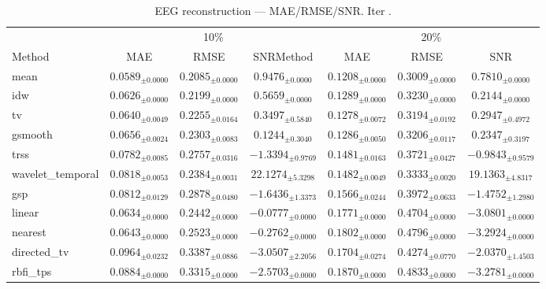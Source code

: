 ﻿%
\begin{table}[ht]
\centering
\caption[EEG reconstruction - Iteration it37]{EEG reconstruction — MAE/RMSE/SNR. Iter .}
\label{tab:main_it37_3syn_alpha_low_missing}
\small
\begin{tabular}{lcccccc}
\toprule
\multicolumn{1}{c}{} & \multicolumn{3}{c}{10\%} & \multicolumn{3}{c}{20\%} \\
\cmidrule(lr){2-4} \cmidrule(lr){5-7}
Method & MAE & RMSE & SNRMethod & MAE & RMSE & SNR \\
\midrule
mean & $0.0589_{\pm 0.0000}$ & $0.2085_{\pm 0.0000}$ & $0.9476_{\pm 0.0000}$ & $0.1208_{\pm 0.0000}$ & $0.3009_{\pm 0.0000}$ & $0.7810_{\pm 0.0000}$ \\
idw & $0.0626_{\pm 0.0000}$ & $0.2199_{\pm 0.0000}$ & $0.5659_{\pm 0.0000}$ & $0.1289_{\pm 0.0000}$ & $0.3230_{\pm 0.0000}$ & $0.2144_{\pm 0.0000}$ \\
tv & $0.0640_{\pm 0.0049}$ & $0.2255_{\pm 0.0164}$ & $0.3497_{\pm 0.5840}$ & $0.1278_{\pm 0.0072}$ & $0.3194_{\pm 0.0192}$ & $0.2947_{\pm 0.4972}$ \\
gsmooth & $0.0656_{\pm 0.0024}$ & $0.2303_{\pm 0.0083}$ & $0.1244_{\pm 0.3040}$ & $0.1286_{\pm 0.0050}$ & $0.3206_{\pm 0.0117}$ & $0.2347_{\pm 0.3197}$ \\
trss & $0.0782_{\pm 0.0085}$ & $0.2757_{\pm 0.0316}$ & $-1.3394_{\pm 0.9769}$ & $0.1481_{\pm 0.0163}$ & $0.3721_{\pm 0.0427}$ & $-0.9843_{\pm 0.9579}$ \\
wavelet\_temporal & $0.0818_{\pm 0.0053}$ & $0.2384_{\pm 0.0031}$ & $22.1274_{\pm 5.3298}$ & $0.1482_{\pm 0.0049}$ & $0.3333_{\pm 0.0020}$ & $19.1363_{\pm 4.8317}$ \\
gsp & $0.0812_{\pm 0.0129}$ & $0.2878_{\pm 0.0480}$ & $-1.6436_{\pm 1.3373}$ & $0.1566_{\pm 0.0244}$ & $0.3972_{\pm 0.0633}$ & $-1.4752_{\pm 1.2980}$ \\
linear & $0.0634_{\pm 0.0000}$ & $0.2442_{\pm 0.0000}$ & $-0.0777_{\pm 0.0000}$ & $0.1771_{\pm 0.0000}$ & $0.4704_{\pm 0.0000}$ & $-3.0801_{\pm 0.0000}$ \\
nearest & $0.0643_{\pm 0.0000}$ & $0.2523_{\pm 0.0000}$ & $-0.2762_{\pm 0.0000}$ & $0.1802_{\pm 0.0000}$ & $0.4796_{\pm 0.0000}$ & $-3.2924_{\pm 0.0000}$ \\
directed\_tv & $0.0964_{\pm 0.0232}$ & $0.3387_{\pm 0.0886}$ & $-3.0507_{\pm 2.2056}$ & $0.1704_{\pm 0.0274}$ & $0.4274_{\pm 0.0770}$ & $-2.0370_{\pm 1.4503}$ \\
rbfi\_tps & $0.0884_{\pm 0.0000}$ & $0.3315_{\pm 0.0000}$ & $-2.5703_{\pm 0.0000}$ & $0.1870_{\pm 0.0000}$ & $0.4833_{\pm 0.0000}$ & $-3.2781_{\pm 0.0000}$ \\

\end{tabular}
\end{table}
